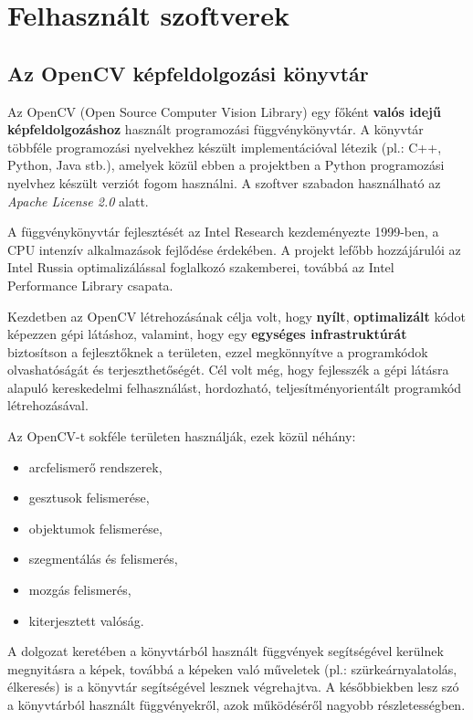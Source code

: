 \chapter{Felhasznált szoftverek}

\section{Az OpenCV képfeldolgozási könyvtár}
Az OpenCV (Open Source Computer Vision Library) egy főként \textbf{valós idejű képfeldolgozáshoz} használt programozási függvénykönyvtár. A könyvtár többféle programozási nyelvekhez készült implementációval létezik (pl.: C++, Python, Java stb.)\cite{opencv_library}, amelyek közül ebben a projektben a Python programozási nyelvhez készült verziót fogom használni. A szoftver szabadon használható az \textit{Apache License 2.0} alatt.
\par A függvénykönyvtár fejlesztését az Intel Research kezdeményezte 1999-ben, a CPU intenzív alkalmazások fejlődése érdekében. A projekt lefőbb hozzájárulói az Intel Russia optimalizálással foglalkozó szakemberei, továbbá az Intel Performance Library csapata. \cite{kaehler2016learning}
\par Kezdetben az OpenCV létrehozásának célja volt, hogy \textbf{nyílt}, \textbf{optimalizált} kódot képezzen gépi látáshoz, valamint, hogy egy \textbf{egységes infrastruktúrát} biztosítson a fejlesztőknek a területen, ezzel megkönnyítve a programkódok olvashatóságát és terjeszthetőségét. Cél volt még, hogy fejlesszék a gépi látásra alapuló kereskedelmi felhasználást, hordozható, teljesítményorientált programkód létrehozásával.\cite{bradski2008learning}
\par Az OpenCV-t sokféle területen használják, ezek közül néhány:
\begin{itemize}
    \setlength\itemsep{-2pt}
    \item arcfelismerő rendszerek,
    \item gesztusok felismerése,
    \item objektumok felismerése,
    \item szegmentálás és felismerés,
    \item mozgás felismerés,
    \item kiterjesztett valóság.
\end{itemize}

\par A dolgozat keretében a könyvtárból használt függvények segítségével kerülnek megnyitásra a képek, továbbá a képeken való műveletek (pl.: szürkeárnyalatolás, élkeresés) is a könyvtár segítségével lesznek végrehajtva. A későbbiekben lesz szó a könyvtárból használt függvényekről, azok működéséről nagyobb részletességben.

